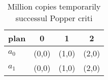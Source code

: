 \documentclass[a4paper]{article}
\begin{document}
\begin{table}
\begin{adjustbox}{width=0.6\columnwidth}
\begin{tabular}{|l|l|l|l|}
\hline
\textbf{plan} & \multicolumn{1}{c|}{\textbf{0}} & \multicolumn{1}{c|}{\textbf{1}} & \multicolumn{1}{c|}{\textbf{2}} \\ \hline
\textbf{$a_0$}  & (0,0) & (1,0) & (2,0) \\ \hline
\textbf{$a_1$}  & (0,0) & (1,0) & (2,0) \\ \hline
\end{tabular}
\end{adjustbox}
\caption{Million copies temporarily successul Popper criti
}
\end{table}
\end{document}
